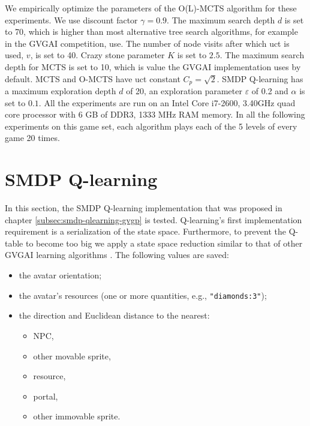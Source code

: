 We empirically optimize the parameters of the O(L)-MCTS algorithm for these
experiments. We use discount factor $\gamma = 0.9$. The maximum search depth $d$
is set to 70, which is higher than most alternative tree search algorithms, for
example in the GVGAI competition, use. The number of node visits after which
\textsf{uct} is used, $v$, is set to 40. Crazy stone parameter $K$ is set to
$2.5$. The maximum search depth for MCTS is set to 10, which is value the GVGAI
implementation uses by default.  MCTS and O-MCTS have \textsf{uct} constant $C_p
= \sqrt{2}$. SMDP Q-learning has a maximum exploration depth $d$ of 20, an
exploration parameter $\varepsilon$ of 0.2 and $\alpha$ is set to $0.1$.  All the
experiments are run on an Intel %
Core %
i7-2600, 3.40GHz quad core processor with 6 GB of DDR3, 1333 MHz RAM memory. In
all the following experiments on this game set, each algorithm plays each of the
5 levels of every game 20 times. 

\section{SMDP Q-learning}
\label{subsec:experiments-smdp-qlearning}
In this section, the SMDP Q-learning implementation that was proposed in chapter
\ref{subsec:smdp-qlearning-gvgp} is tested. Q-learning's first implementation
requirement is a serialization of the state space.  Furthermore, to prevent the
Q-table to become too big we apply a state space reduction similar to that of
other GVGAI learning algorithms \cite{samothrakis2015neuroevolution}.  The
following values are saved:

\begin{itemize}
	\item the avatar orientation;
	\item the avatar's resources (one or more quantities, e.g.,
		\texttt{"diamonds:3"});
	\item the direction and Euclidean distance to the nearest:
		\begin{itemize}
			\item NPC,
			\item other movable sprite,
			\item resource,
			\item portal,
			\item other immovable sprite.
		\end{itemize}
\end{itemize}

